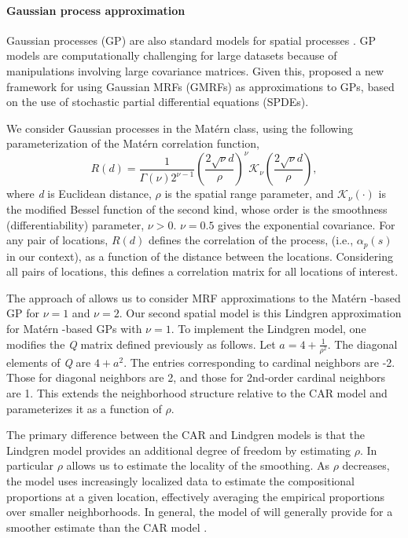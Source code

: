 \documentclass[10pt,letterpaper]{article}
\newcommand{\matern}{Mat\'{e}rn }
\begin{document}
\paragraph{Gaussian process approximation}

Gaussian processes (GP) are also standard models for spatial processes \cite{Bane:etal:2004}.
GP models are computationally challenging for large datasets because
of manipulations involving large covariance matrices. Given this,
\cite{Lind:etal:2011} proposed a new framework for using Gaussian
MRFs (GMRFs) as approximations to GPs, based on the use of stochastic
partial differential equations (SPDEs).

We consider Gaussian processes in the \matern class, using the following
parameterization of the \matern correlation function, 
\begin{equation}
R(d)=\frac{1}{\Gamma(\nu)2^{\nu-1}}\left(\frac{2\sqrt{\nu}d}{\rho}\right)^{\nu}\mathcal{K}_{\nu}\left(\frac{2\sqrt{\nu}d}{\rho}\right),
\end{equation}
where \emph{d} is Euclidean distance, $\rho$ is the spatial range parameter,
and $\mathcal{K}_{\nu}(\cdot)$ is the modified Bessel function of
the second kind, whose order is the smoothness (differentiability)
parameter, $\nu>0$. $\nu=0.5$ gives the exponential covariance.
For any pair of locations, $R(d)$ defines the correlation of the
process, (i.e., $\alpha_{p}(s)$ in our context), as a function of
the distance between the locations. Considering all pairs of locations,
this defines a correlation matrix for all locations of interest. 

The  approach of \cite{Lind:etal:2011} allows us to consider MRF approximations
to the \matern-based GP for $\nu=1$ and $\nu=2$. Our second spatial
model is this Lindgren approximation for \matern-based GPs with $\nu=1$.
To implement the Lindgren model, one modifies the \emph{Q} matrix defined
previously as follows. Let $a=4+\frac{1}{\rho^{2}}$. The diagonal
elements of \emph{Q} are $4+a^{2}$. The entries corresponding to cardinal
neighbors are -2. Those for diagonal neighbors are 2, and those
for 2nd-order cardinal neighbors are 1. This extends the neighborhood
structure relative to the CAR model and parameterizes it as a function
of $\rho$.

The primary difference between the CAR and Lindgren models is that
the Lindgren model provides an additional degree of freedom by estimating
$\rho$. In particular $\rho$ allows us to estimate the locality
of the smoothing. As $\rho$ decreases, the model uses increasingly
localized data to estimate the compositional proportions at a given
location, effectively averaging the empirical proportions over smaller
neighborhoods. In general, the model of \cite{Lind:etal:2011} will generally
provide for a smoother estimate than the CAR model \cite{Paci:2013}. 
\end{document}
